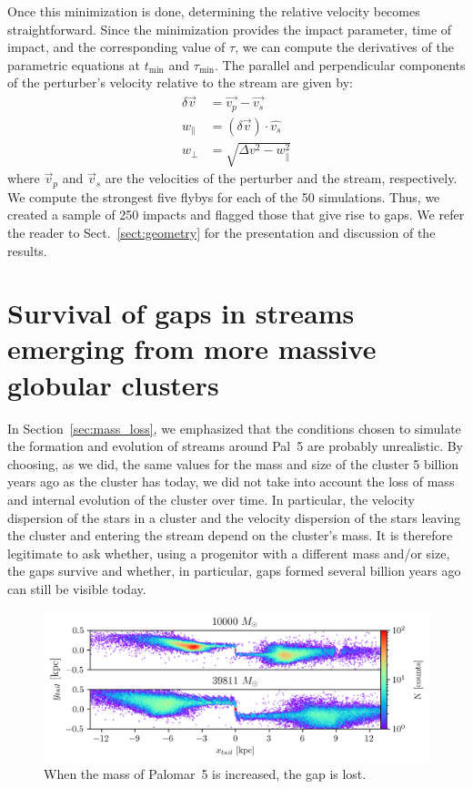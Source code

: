 \documentclass{aa}
\begin{document}
\begin{appendix}
      Once this minimization is done, determining the relative velocity becomes straightforward. Since the minimization provides the impact parameter, time of impact, and the corresponding value of $\tau$, we can compute the derivatives of the parametric equations at $t_{\text{min}}$ and $\tau_{\text{min}}$. The parallel and perpendicular components of the perturber's velocity relative to the stream are given by:
      \begin{equation}
        \begin{aligned}
          \delta \vec{v} &=\vec{v_p} - \vec{v_s} \\
          w_\parallel &= \left(\delta \vec{v}\right)\cdot \hat{v_s}\\  
          w_\perp &=  \sqrt{\Delta v ^2 - w_\parallel ^ 2}
          \end{aligned}
        \end{equation}
      where $\vec{v}_p$ and $\vec{v}_s$ are the velocities of the perturber and the stream, respectively. We compute the strongest five flybys for each of the 50 simulations. Thus, we created a sample of 250 impacts and flagged those that give rise to gaps. We refer the reader to Sect.~\ref{sect:geometry} for the presentation and discussion of the results.



\section{Survival of gaps in streams emerging from more massive globular clusters}\label{sec:gaps_vs_gcmass}

In Section~\ref{sec:mass_loss}, we emphasized that the conditions chosen to simulate the formation and evolution of streams around Pal~5 are probably unrealistic. By choosing, as we did, the same values for the mass and size of the cluster 5 billion years ago as the cluster has today, we did not take into account the loss of mass and internal evolution of the cluster over time. In particular, the velocity dispersion of the stars in a cluster and the velocity dispersion of the stars leaving the cluster and entering the stream depend on the cluster's mass. It is therefore legitimate to ask whether, using a progenitor with a different mass and/or size, the gaps survive and whether, in particular, gaps formed several billion years ago can still be visible today. 

\begin{figure}
    \centering
    \includegraphics[width=1\linewidth]{gap_no_more.png}
    \caption{When the mass of Palomar~5 is increased, the gap is lost.}
    \label{fig:gap_no_more}
\end{figure}


\end{appendix}
\end{document}
